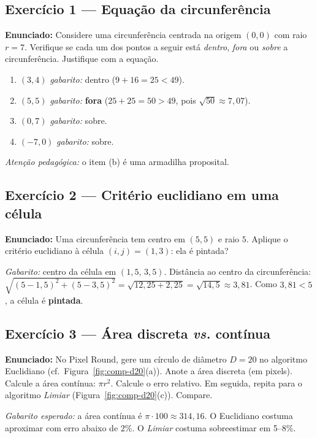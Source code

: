 \documentclass[12pt,a4paper]{scrartcl}
\newcommand{\acc}[1]{\textcolor{accent}{\textbf{#1}}}
\begin{document}
\subsection*{Exercício 1 --- Equação da circunferência}
\textbf{Enunciado:} Considere uma circunferência centrada na origem $(0, 0)$ com raio $r = 7$. Verifique se cada um dos pontos a seguir está \emph{dentro}, \emph{fora} ou \emph{sobre} a circunferência. Justifique com a equação.
\begin{enumerate}[label=\alph*),leftmargin=1.5em,itemsep=0.1em,topsep=0.2em,nosep]
  \item $(3, 4)$ \hfill \emph{gabarito:} dentro ($9 + 16 = 25 < 49$).
  \item $(5, 5)$ \hfill \emph{gabarito:} \acc{fora} ($25 + 25 = 50 > 49$, pois $\sqrt{50} \approx 7{,}07$).
  \item $(0, 7)$ \hfill \emph{gabarito:} sobre.
  \item $(-7, 0)$ \hfill \emph{gabarito:} sobre.
\end{enumerate}

\textit{Atenção pedagógica:} o item (b) é uma armadilha proposital.

\subsection*{Exercício 2 --- Critério euclidiano em uma célula}
\textbf{Enunciado:} Uma circunferência tem centro em $(5, 5)$ e raio $5$. Aplique o critério euclidiano à célula $(i, j) = (1, 3)$: ela é pintada?

\emph{Gabarito:} centro da célula em $(1{,}5,\, 3{,}5)$. Distância ao centro da circunferência: $\sqrt{(5{-}1{,}5)^2 + (5{-}3{,}5)^2} = \sqrt{12{,}25 + 2{,}25} = \sqrt{14{,}5} \approx 3{,}81$. Como $3{,}81 < 5$, a célula é \acc{pintada}.

\subsection*{Exercício 3 --- Área discreta \emph{vs.} contínua}
\textbf{Enunciado:} No Pixel Round, gere um círculo de diâmetro $D = 20$ no algoritmo Euclidiano (cf.\ Figura~\ref{fig:comp-d20}(a)). Anote a área discreta (em pixels). Calcule a área contínua: $\pi r^2$. Calcule o erro relativo. Em seguida, repita para o algoritmo \emph{Limiar} (Figura~\ref{fig:comp-d20}(c)). Compare.

\emph{Gabarito esperado:} a área contínua é $\pi \cdot 100 \approx 314{,}16$. O Euclidiano costuma aproximar com erro abaixo de $2\%$. O \emph{Limiar} costuma sobreestimar em 5--8\%.
\end{document}

